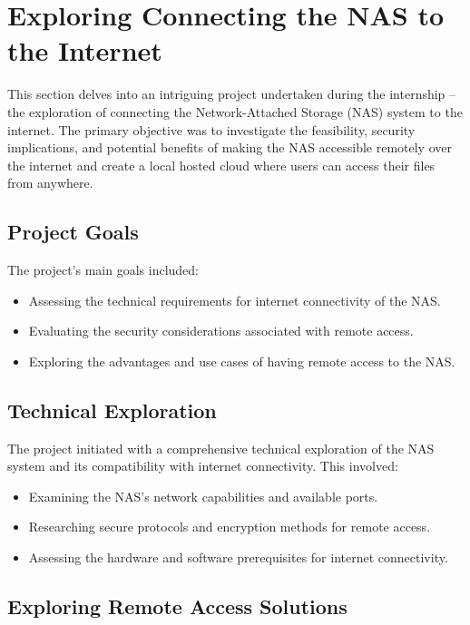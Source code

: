 \section{Exploring Connecting the NAS to the Internet}

This section delves into an intriguing project undertaken during the internship – the exploration of connecting the Network-Attached Storage (NAS) system to the internet. The primary objective was to investigate the feasibility, security implications, and potential benefits of making the NAS accessible remotely over the internet and create a local hosted cloud where users can access their files from anywhere.

\subsection{Project Goals}

The project's main goals included:

\begin{itemize}
  \item Assessing the technical requirements for internet connectivity of the NAS.
  \item Evaluating the security considerations associated with remote access.
  \item Exploring the advantages and use cases of having remote access to the NAS.
\end{itemize}

\subsection{Technical Exploration}

The project initiated with a comprehensive technical exploration of the NAS system and its compatibility with internet connectivity. This involved:

\begin{itemize}
  \item Examining the NAS's network capabilities and available ports.
  \item Researching secure protocols and encryption methods for remote access.
  \item Assessing the hardware and software prerequisites for internet connectivity.
\end{itemize}

\subsection{Exploring Remote Access Solutions}

